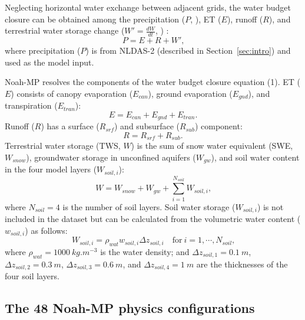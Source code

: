 \documentclass[essd, manuscript]{copernicus}
\let\unit\undefined
\begin{document}
Neglecting horizontal water exchange between adjacent grids, the water budget closure can be obtained among the precipitation (\(P\), \unit{kg.m^{-2}.s^{-1}}), ET (\(E\)), runoff (\(R\)), and terrestrial water storage change (\(W'=\frac{dW}{dt}\), \unit{kg.m^{-2}.s^{-1}}) \citep{zheng2020JAMES}:
\begin{equation}
  P = E + R + W'
  \text{,}
\end{equation}
where precipitation (\(P\)) is from NLDAS-2 (described in Section~\ref{sec:intro}) and used as the model input.

Noah-MP resolves the components of the water budget closure equation (1). ET (\(E\)) consists of canopy evaporation (\(E_{can}\)), ground evaporation (\(E_{gnd}\)), and transpiration (\(E_{tran}\)):
\begin{equation}
  E = E_{can} + E_{gnd} + E_{tran}
  \text{.}
\end{equation}
Runoff (\(R\)) has a surface (\(R_{srf}\)) and subsurface (\(R_{sub}\)) component:
\begin{equation}
  R = R_{srf} + R_{sub}
  \text{.}
\end{equation}
Terrestrial water storage (TWS, \(W\)) is the sum of snow water equivalent (SWE, \(W_{snow}\)), groundwater storage in unconfined aquifers (\(W_{gw}\)), and soil water content in the four model layers (\(W_{soil,i}\)):
\begin{equation}
  W = W_{snow} + W_{gw} + \sum_{i=1}^{N_{soil}} W_{soil,i}
  \text{,}
\end{equation}
where \(N_{soil} = 4\) is the number of soil layers. Soil water storage (\(W_{soil,i}\)) is not included in the dataset but can be calculated from the volumetric water content (\(w_{soil,i}\)) as follows:
\begin{equation}
  W_{soil,i} = \rho_{wat} w_{soil,i} \Delta z_{soil,i} \quad \mathrm{for}\ i = 1, \cdots, N_{soil}
  \text{,}
\end{equation}
where \(\rho_{wat} = \qty{1000}{kg.m^{-3}}\) is the water density; and \(\Delta z_{soil,1} = \qty{0.1}{m}\), \(\Delta z_{soil,2} = \qty{0.3}{m}\), \(\Delta z_{soil,3} = \qty{0.6}{m}\), and \(\Delta z_{soil,4} = \qty{1}{m}\) are the thicknesses of the four soil layers.

\subsection{The 48 Noah-MP physics configurations}\label{sec:data:noahmp}
\end{document}
